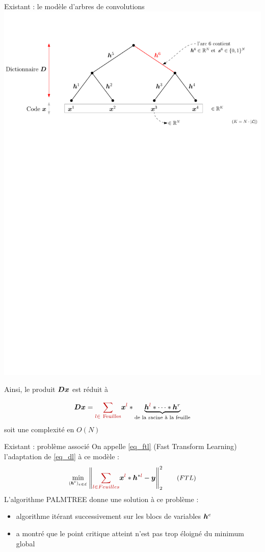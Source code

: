 \begin{frame}{Existant : le modèle d'arbres de convolutions}
\includegraphics[width=\textwidth]{figures/tree.pdf}

Ainsi, le produit $\bm{D}\bm{x}$ est réduit à

\begin{equation}
\D \x = \Req{\sum_{l \in ~\text{Feuilles}}} \x^{\Req{l}} * \underbrace{\h^{\Req{l}}* \dots* \h^{r}}_{\textrm{de la racine à la feuille}}
\end{equation}
soit une complexité en \alert{$O(N)$}

\end{frame}
 

\begin{frame}{Existant : problème associé}
On appelle \eqref{eq_ftl} (\alert{Fast Transform Learning}) l'adaptation de \eqref{eq_dl} à ce modèle :
\begin{equation*} {\small
\underset{\substack{(\h^\text{e})_{e \in \E}}}\min
	\norm{\Req{\sum_{l \in Feuilles}} \x^{\Req{l}} * \h^{*\Req{l}} -\y}{2}^2 \tag{${FTL}$} \label{eq_ftl}
    }
\end{equation*}
L'algorithme \alert{PALMTREE} donne une solution à ce problème :
\begin{itemize}
	\item algorithme itérant successivement sur les blocs de variables $\bm{h}^e$
	\item \cite{chabiron_optimization_2016} a montré que le point  critique atteint n'est pas trop éloigné du minimum global
\end{itemize}
\end{frame}


